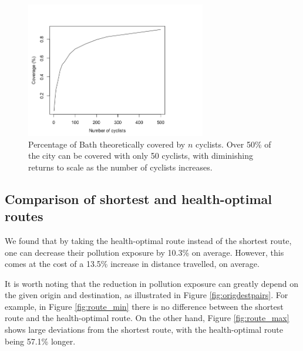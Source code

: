 \documentclass[11pt]{report}
\begin{document}

\begin{figure}[!tb]
\centering
\includegraphics[width=0.7\textwidth]{images/coverage}
\caption[Cyclist coverage.]{Percentage of Bath theoretically covered by $n$ cyclists. Over 50\% of the city can be covered with only 50 cyclists, with diminishing returns to scale as the number of cyclists increases.}
\label{fig:coverage}
\end{figure}


\subsection{Comparison of shortest and health-optimal routes}

We found that by taking the health-optimal route instead of the shortest route, one can decrease their pollution exposure by 10.3\% on average. However, this comes at the cost of a 13.5\% increase in distance travelled, on average.


It is worth noting that the reduction in pollution exposure can greatly depend on the given origin and destination, as illustrated in Figure \ref{fig:origdestpairs}. For example, in Figure \ref{fig:route_min} there is no difference between the shortest route and the health-optimal route. On the other hand, Figure \ref{fig:route_max} shows large deviations from the shortest route, with the health-optimal route being 57.1\% longer.
\end{document}
